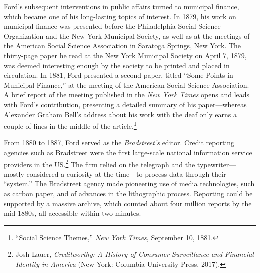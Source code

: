 \documentclass[twoside,symmetric,nobib,justified]{tufte-book}
\begin{document}
Ford's subsequent interventions in public affairs turned to municipal
finance, which became one of his long-lasting topics of interest. In
1879, his work on municipal finance was presented before the
Philadelphia Social Science Organization and the New York Municipal
Society, as well as at the meetings of the American Social Science
Association in Saratoga Springs, New York. The thirty-page paper he read
at the New York Municipal Society on April 7, 1879, was deemed
interesting enough by the society to be printed and placed in
circulation. In 1881, Ford presented a second paper, titled ``Some
Points in Municipal Finance,'' at the meeting of the American Social
Science Association. A brief report of the meeting published in the
\emph{New York Times} opens and leads with Ford's contribution,
presenting a detailed summary of his paper---whereas Alexander Graham
Bell's address about his work with the deaf only earns a couple of lines
in the middle of the article.\footnote{``Social Science Themes,''
  \emph{New York Times}, September 10, 1881.}

\newpage From 1880 to 1887, Ford served as the \emph{Bradstreet's} editor. Credit
reporting agencies such as Bradstreet were the first large-scale
national information service providers in the US.\footnote{Josh Lauer,
  \emph{Creditworthy: A History of Consumer Surveillance and Financial
  Identity in America} (New York: Columbia University Press, 2017).} The
firm relied on the telegraph and the typewriter---mostly considered a
curiosity at the time---to process data through their ``system.'' The
Bradstreet agency made pioneering use of media technologies, such as
carbon paper, and of advances in the lithographic process. Reporting
could be supported by a massive archive, which counted about four
million reports by the mid-1880s, all accessible within two minutes.
\end{document}
